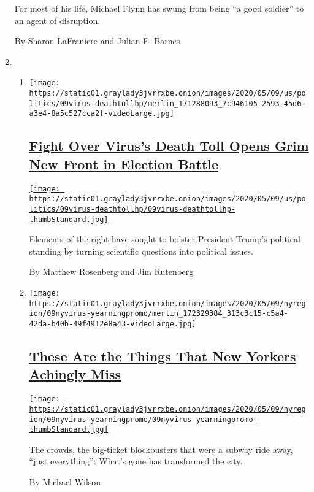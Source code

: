 \begin{enumerate}
  For most of his life, Michael Flynn has swung from being ``a good
  soldier'' to an agent of disruption.

  By Sharon LaFraniere and Julian E. Barnes
\item
  \begin{enumerate}
  \def\labelenumii{\arabic{enumii}.}
  \item
    \texttt{[image: https://static01.graylady3jvrrxbe.onion/images/2020/05/09/us/politics/09virus-deathtollhp/merlin\_171288093\_7c946105-2593-45d6-a3e4-8a5c527cca2f-videoLarge.jpg]}

    \hypertarget{fight-over-viruss-death-toll-opens-grim-new-front-in-election-battle}{%
    \subsection{\texorpdfstring{\href{/2020/05/09/us/politics/coronavirus-death-toll-presidential-campaign.html}{Fight
    Over Virus's Death Toll Opens Grim New Front in Election
    Battle}}{Fight Over Virus's Death Toll Opens Grim New Front in Election Battle}}\label{fight-over-viruss-death-toll-opens-grim-new-front-in-election-battle}}

    \href{/2020/05/09/us/politics/coronavirus-death-toll-presidential-campaign.html}{\texttt{[image: https://static01.graylady3jvrrxbe.onion/images/2020/05/09/us/politics/09virus-deathtollhp/09virus-deathtollhp-thumbStandard.jpg]}}

    Elements of the right have sought to bolster President Trump's
    political standing by turning scientific questions into political
    issues.

    By Matthew Rosenberg and Jim Rutenberg
  \item
    \texttt{[image: https://static01.graylady3jvrrxbe.onion/images/2020/05/09/nyregion/09nyvirus-yearningpromo/merlin\_172329384\_313c3c15-c5a4-42da-b40b-49f4912e8a43-videoLarge.jpg]}

    \hypertarget{these-are-the-things-that-new-yorkers-achingly-miss}{%
    \subsection{\texorpdfstring{\href{/2020/05/09/nyregion/new-yorkers-missing-nyc-coronavirus.html}{These
    Are the Things That New Yorkers Achingly
    Miss}}{These Are the Things That New Yorkers Achingly Miss}}\label{these-are-the-things-that-new-yorkers-achingly-miss}}

    \href{/2020/05/09/nyregion/new-yorkers-missing-nyc-coronavirus.html}{\texttt{[image: https://static01.graylady3jvrrxbe.onion/images/2020/05/09/nyregion/09nyvirus-yearningpromo/09nyvirus-yearningpromo-thumbStandard.jpg]}}

    The crowds, the big-ticket blockbusters that were a subway ride
    away, ``just everything'': What's gone has transformed the city.

    By Michael Wilson
  \end{enumerate}
\end{enumerate}

